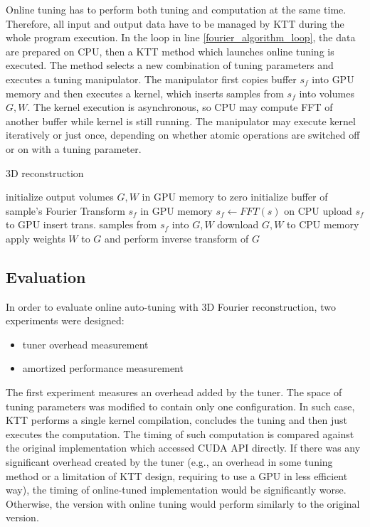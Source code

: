 \documentclass
[
    digital, %
    oneside, %
    table, %
    nolof, %
    nolot, %
    nocover %
]{fithesis3}
\begin{document}
Online tuning has to perform both tuning and computation at the same time. Therefore, all input and output data have to be managed by KTT during the whole program
execution. In the loop in line \ref{fourier_algorithm_loop}, the data are prepared on CPU, then a KTT method which launches online tuning is executed. The
method selects a new combination of tuning parameters and executes a tuning manipulator. The manipulator first copies buffer $s_f$ into GPU memory and then
executes a kernel, which inserts samples from $s_f$ into volumes $G, W$. The kernel execution is asynchronous, so CPU may compute FFT of another buffer while
kernel is still running. The manipulator may execute kernel iteratively or just once, depending on whether atomic operations are switched off or on with
a tuning parameter.

\begin{algorithm}
    \small
    \caption{3D reconstruction}
    \label{fourier_algorithm}
    \begin{algorithmic}[1]
        \State initialize output volumes $G, W$ in GPU memory to zero
        \State initialize buffer of sample's Fourier Transform $s_f$ in GPU memory
         \label{fourier_algorithm_loop}
        \State $s_f \leftarrow FFT(s)$ on CPU
        \State upload $s_f$ to GPU
        \State insert trans. samples from $s_f$ into $G, W$
        \EndFor
        \State download $G, W$ to CPU memory
        \State apply weights $W$ to $G$ and perform inverse transform of $G$
    \end{algorithmic}
\end{algorithm}

\subsection{Evaluation}
In order to evaluate online auto-tuning with 3D Fourier reconstruction, two experiments were designed:
\begin{itemize}
    \item tuner overhead measurement
    \item amortized performance measurement
\end{itemize}
The first experiment measures an overhead added by the tuner. The space of tuning parameters was modified to contain only one configuration. In such case,
KTT performs a single kernel compilation, concludes the tuning and then just executes the computation. The timing of such computation is compared against
the original implementation which accessed CUDA API directly. If there was any significant overhead created by the tuner (e.g., an overhead in some tuning
method or a limitation of KTT design, requiring to use a GPU in less efficient way), the timing of online-tuned implementation would be significantly worse.
Otherwise, the version with online tuning would perform similarly to the original version.
\end{document}

